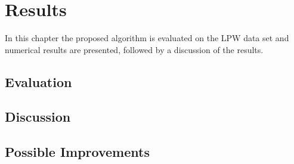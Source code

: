 \chapter{Results}
In this chapter the proposed algorithm is evaluated on the LPW data set and numerical results are presented, followed by a discussion of the results. 
\section{Evaluation}
\section{Discussion}
\section{Possible Improvements}
